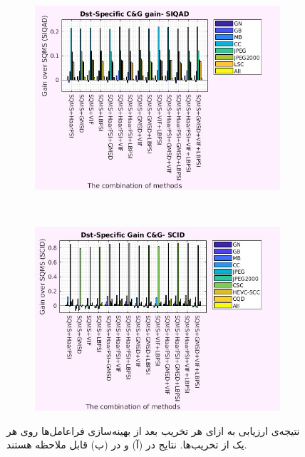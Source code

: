 \documentclass[twocolumn]{article}
\begin{document}
\begin{figure}
	\begin{subfigure}{0.47\textwidth}
		\includegraphics[width=\textwidth]{per_distortion_hyper_SIQAD}
		\caption{}
		\label{fig:res_per_distortion_SIQAD_hyper}
	\end{subfigure} \\
	\begin{subfigure}{0.47\textwidth}
		\includegraphics[width=\textwidth]{per_distortion_hyper_SCID}
		\caption{}
		\label{fig:res_per_distortion_SCID_hyper}
	\end{subfigure}
	\caption{نتیجه‌ی ارزیابی به ازای هر تخریب بعد از بهینه‌سازی فراعامل‌ها روی هر یک از تخریب‌ها. نتایج  در (آ) و  در (ب) قابل ملاحظه هستند.}
	\label{fig:res_per_dist_hyper}
\end{figure}
\end{document}
